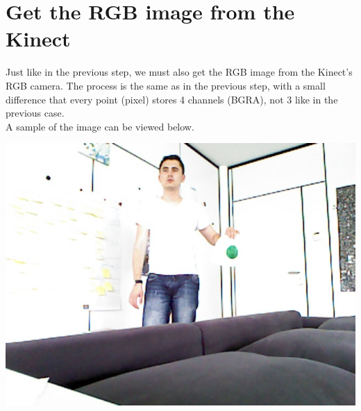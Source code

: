 \section{Get the RGB image from the Kinect}
\noindent
Just like in the previous step, we must also get the RGB image from the Kinect's RGB camera. The process is the same as in the previous step, with a small difference that every point (pixel) stores 4 channels (BGRA), not 3 like in the previous case. 
\\ 
A sample of the image can be viewed below. 

\begin{center}
	\includegraphics[scale=0.4]{images/kinect_rgb_image.jpg}
	\label{fig:kinect_rgb_image}
\end{center}

